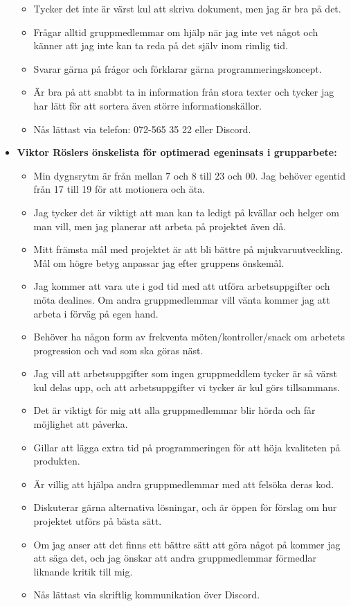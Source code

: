 \documentclass{mall}
\begin{document}
\begin{itemize}
\begin{itemize}
  \item Tycker det inte är värst kul att skriva dokument, men jag är bra på det.
  \item Frågar alltid gruppmedlemmar om hjälp när jag inte vet något och känner att jag inte kan ta reda på det själv inom rimlig tid.
  \item Svarar gärna på frågor och förklarar gärna programmeringskoncept.
  \item Är bra på att snabbt ta in information från stora texter och tycker jag har lätt för att sortera även större informationskällor.
  \item Nås lättast via telefon: 072-565 35 22 eller Discord.
  \end{itemize}

\item \textbf{Viktor Röslers önskelista för optimerad egeninsats i grupparbete:}
  \begin{itemize}
  \item Min dygnsrytm är från mellan 7 och 8 till 23 och 00. Jag behöver egentid från 17 till 19 för att motionera och äta.  
  \item Jag tycker det är viktigt att man kan ta ledigt på kvällar och helger om man vill, men jag planerar att arbeta på projektet även då.  
  \item Mitt främsta mål med projektet är att bli bättre på mjukvaruutveckling. Mål om högre betyg anpassar jag efter gruppens önskemål. 
  \item Jag kommer att vara ute i god tid med att utföra arbetsuppgifter och möta dealines. Om andra gruppmedlemmar vill vänta kommer jag att arbeta i förväg på egen hand.
  \item Behöver ha någon form av frekventa möten/kontroller/snack om arbetets progression och vad som ska göras näst.
  \item Jag vill att arbetsuppgifter som ingen gruppmeddlem tycker är så värst kul delas upp, och att arbetsuppgifter vi tycker är kul görs tillsammans. 
  \item Det är viktigt för mig att alla gruppmedlemmar blir hörda och får möjlighet att påverka.
  \item Gillar att lägga extra tid på programmeringen för att höja kvaliteten på produkten.   
  \item Är villig att hjälpa andra gruppmedlemmar med att felsöka deras kod.
  \item Diskuterar gärna alternativa lösningar, och är öppen för förslag om hur projektet utförs på bästa sätt.
  \item Om jag anser att det finns ett bättre sätt att göra något på kommer jag att säga det, och jag önskar att andra gruppmedlemmar förmedlar liknande kritik till mig.
  \item Nås lättast via skriftlig kommunikation över Discord.
  \end{itemize}


\end{itemize}
\end{document}
